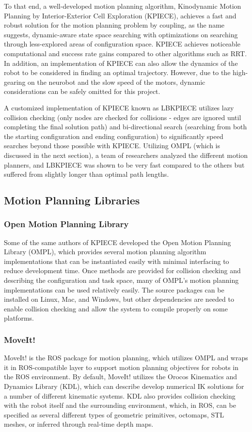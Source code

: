 \documentclass[12pt]{report}
\begin{document}
To that end, a well-developed motion planning algorithm, Kinodynamic Motion Planning by Interior-Exterior Cell Exploration (KPIECE), achieves a fast and robust solution for the motion planning problem by coupling, as the name suggests, dynamic-aware state space searching with optimizations on searching through less-explored areas of configuration space. \cite{kpiece} KPIECE achieves noticeable computational and success rate gains compared to other algorithms such as RRT. \cite{kpiece} In addition, an implementation of KPIECE can also allow the dynamics of the robot to be considered in finding an optimal trajectory. However, due to the high-gearing on the neurobot and the slow speed of the motors, dynamic considerations can be safely omitted for this project. 

A customized implementation of KPIECE known as LBKPIECE utilizes lazy collision checking (only nodes are checked for collisions - edges are ignored until completing the final solution path) and bi-directional search (searching from both the starting configuration and ending configuration) to significantly speed searches beyond those possible with KPIECE. Utilizing OMPL (which is discussed in the next section), a team of researchers analyzed the different motion planners, and LBKPIECE was shown to be very fast compared to the others but suffered from slightly longer than optimal path lengths. \cite{omplBenchmarks}

\subsection{Motion Planning Libraries}
\subsubsection{Open Motion Planning Library}
Some of the same authors of KPIECE developed the Open Motion Planning Library (OMPL), which provides several motion planning algorithm implementations that can be instantiated easily with minimal interfacing to reduce development time. \cite{ompl} Once methods are provided for collision checking and describing the configuration and task space, many of OMPL's motion planning implementations can be used relatively easily. The source packages can be installed on Linux, Mac, and Windows, but other dependencies are needed to enable collision checking and allow the system to compile properly on some platforms.

\subsubsection{MoveIt!}
MoveIt! is the ROS package for motion planning, which utilizes OMPL and wraps it in ROS-compatible layer to support motion planning objectives for robots in the ROS environment. \cite{moveIt} By default, MoveIt! utilizes the Orocos Kinematics and Dynamics Library (KDL), which can describe develop numerical IK solutions for a number of different kinematic systems. \cite{orocosKDL} KDL also provides collision checking with the robot itself and the surrounding environment, which, in ROS, can be specified as several different types of geometric primitives, octomaps, STL meshes, or inferred through real-time depth maps.
\end{document}
